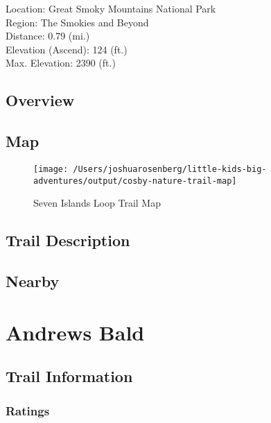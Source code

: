 \documentclass[
]{book}
\begin{document}
Location: Great Smoky Mountains National Park\\
Region: The Smokies and Beyond\\
Distance: 0.79 (mi.)\\
Elevation (Ascend): 124 (ft.)\\
Max. Elevation: 2390 (ft.)

\hypertarget{overview-16}{%
\section{Overview}\label{overview-16}}

\hypertarget{map-16}{%
\section{Map}\label{map-16}}

\begin{figure}
\texttt{[image: /Users/joshuarosenberg/little-kids-big-adventures/output/cosby-nature-trail-map]} \caption{Seven Islands Loop Trail Map}\label{fig:unnamed-chunk-55}
\end{figure}

\hypertarget{trail-description-17}{%
\section{Trail Description}\label{trail-description-17}}

\hypertarget{nearby-17}{%
\section{Nearby}\label{nearby-17}}

\hypertarget{andrews-bald}{%
\chapter{Andrews Bald}\label{andrews-bald}}

\hypertarget{trail-information-17}{%
\section{Trail Information}\label{trail-information-17}}

\hypertarget{ratings-13}{%
\subsection{Ratings}\label{ratings-13}}
\end{document}
